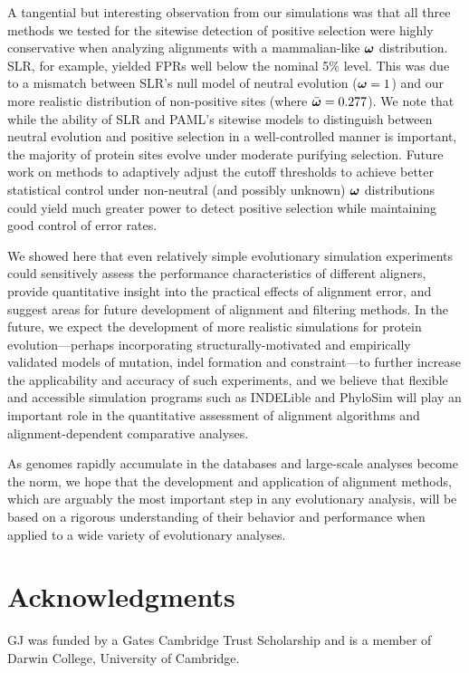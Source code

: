 \documentclass{article}
\begin{document}
A tangential but interesting observation from our simulations was that
all three methods we tested for the sitewise detection of positive
selection were highly conservative when analyzing alignments with a
mammalian-like $\bm{\omega}$ distribution. SLR, for example, yielded FPRs
well below the nominal 5\% level. This was due to a mismatch between
SLR's null model of neutral evolution ($\bm{\omega}=1$) and our more
realistic distribution of non-positive sites (where
$\bar{\bm{\omega}}=0.277$). We note that while the ability of SLR and PAML's
sitewise models to distinguish between neutral evolution and positive
selection in a well-controlled manner is important, the majority of
protein sites evolve under moderate purifying selection. Future work
on methods to adaptively adjust the cutoff thresholds to achieve
better statistical control under non-neutral (and possibly unknown)
$\bm{\omega}$ distributions could yield much greater power to detect positive
selection while maintaining good control of error rates.

We showed here that even relatively simple evolutionary simulation
experiments could sensitively assess the performance characteristics
of different aligners, provide quantitative insight into the practical
effects of alignment error, and suggest areas for future development
of alignment and filtering methods. In the future, we expect the
development of more realistic simulations for protein
evolution---perhaps incorporating structurally-motivated and
empirically validated models of mutation, indel formation and
constraint---to further increase the applicability and accuracy of
such experiments, and we believe that flexible and accessible
simulation programs such as INDELible \citep{Fletcher2009INDELible}
and PhyloSim \citep{Sipos2011PhyloSim} will play an important role in
the quantitative assessment of alignment algorithms and
alignment-dependent comparative analyses.

As genomes rapidly accumulate in the databases and
large-scale analyses become the norm, we hope that the development and
application of alignment methods, which are arguably the most
important step in any evolutionary analysis, will be based on a
rigorous understanding of their behavior and performance when applied
to a wide variety of evolutionary analyses.

\section*{Acknowledgments}

GJ was funded by a Gates Cambridge Trust Scholarship and is a member
of Darwin College, University of Cambridge.

 \fontsize{9}{10}\selectfont%

\end{document}
